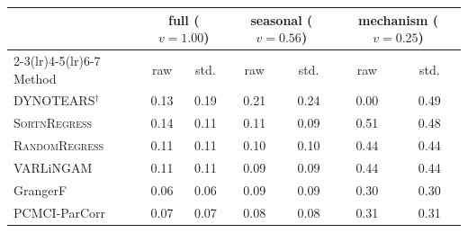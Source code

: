 \begin{tabular}{lcccccc}
\toprule
 & \multicolumn{2}{c}{full ($v{=}1.00$)} & \multicolumn{2}{c}{seasonal ($v{=}0.56$)} & \multicolumn{2}{c}{mechanism ($v{=}0.25$)} \\
\cmidrule(lr){2-3}\cmidrule(lr){4-5}\cmidrule(lr){6-7}
Method & raw & std. & raw & std. & raw & std. \\
\midrule
DYNOTEARS$^{\dagger}$ & 0.13 & 0.19 & 0.21 & 0.24 & 0.00 & 0.49 \\
\textsc{SortnRegress} & 0.14 & 0.11 & 0.11 & 0.09 & 0.51 & 0.48 \\
\textsc{RandomRegress} & 0.11 & 0.11 & 0.10 & 0.10 & 0.44 & 0.44 \\
VARLiNGAM & 0.11 & 0.11 & 0.09 & 0.09 & 0.44 & 0.44 \\
GrangerF & 0.06 & 0.06 & 0.09 & 0.09 & 0.30 & 0.30 \\
PCMCI-ParCorr & 0.07 & 0.07 & 0.08 & 0.08 & 0.31 & 0.31 \\
\bottomrule
\end{tabular}
